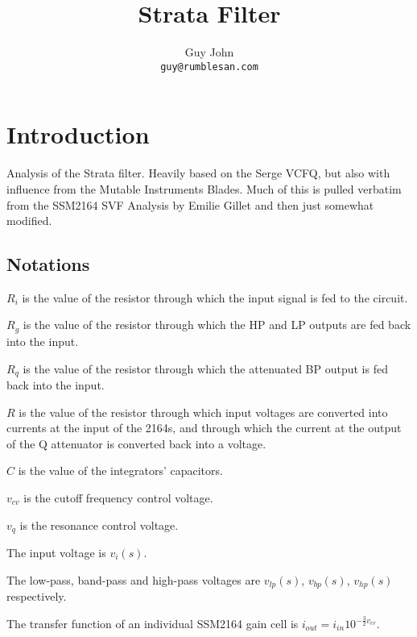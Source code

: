 \documentclass{article}
\title{Strata Filter}
\author{Guy John \\ \texttt{guy@rumblesan.com}}
\begin{document}
\maketitle

\section{Introduction}
Analysis of the Strata filter. Heavily based on the Serge VCFQ, but also with influence from the Mutable Instruments Blades. Much of this is pulled verbatim from the SSM2164 SVF Analysis by Emilie Gillet and then just somewhat modified.


\newpage

\subsection{Notations}

\begin{description}
\item $R_i$ is the value of the resistor through which the input signal is fed to the circuit.
\item $R_g$ is the value of the resistor through which the HP and LP outputs are fed back into the input.
\item $R_q$ is the value of the resistor through which the attenuated BP output is fed back into the input.
\item $R$ is the value of the resistor through which input voltages are converted into currents at the input of the 2164s, and through which the current at the output of the Q attenuator is converted back into a voltage.
\item $C$ is the value of the integrators' capacitors.
\item $v_{cv}$ is the cutoff frequency control voltage.
\item $v_q$ is the resonance control voltage.
\end{description}

The input voltage is $v_i(s)$.

The low-pass, band-pass and high-pass voltages are $v_{lp}(s)$, $v_{bp}(s)$, $v_{hp}(s)$ respectively.

The transfer function of an individual SSM2164 gain cell is $i_{out} = i_{in}10^{-{\frac{3}{2}}v_{cv}}$.
\end{document}
